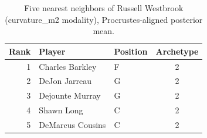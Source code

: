 \begin{table}[htbp]
  \centering\small
  \begin{tabular}{rllc}
    \toprule
    Rank & Player & Position & Archetype \\
    \midrule
    1 & Charles Barkley & F & 2 \\
    2 & DeJon Jarreau & G & 2 \\
    3 & Dejounte Murray & G & 2 \\
    4 & Shawn Long & C & 2 \\
    5 & DeMarcus Cousins & C & 2 \\
    \bottomrule
  \end{tabular}
  \caption{Five nearest neighbors of Russell Westbrook (curvature_m2 modality), Procrustes-aligned posterior mean.}
  \label{tab:Russell_Westbrook_neighbors_curvature_m2}
\end{table}

